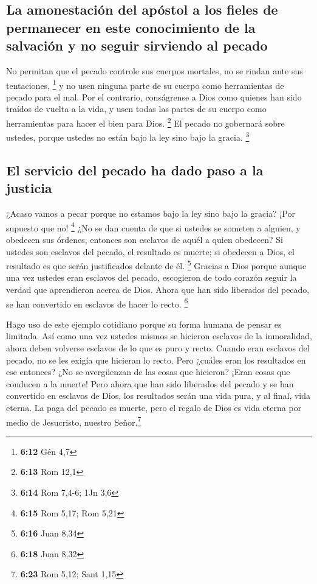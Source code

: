 \hypertarget{la-amonestaciuxf3n-del-apuxf3stol-a-los-fieles-de-permanecer-en-este-conocimiento-de-la-salvaciuxf3n-y-no-seguir-sirviendo-al-pecado}{%
\subsection{La amonestación del apóstol a los fieles de permanecer en
este conocimiento de la salvación y no seguir sirviendo al
pecado}\label{la-amonestaciuxf3n-del-apuxf3stol-a-los-fieles-de-permanecer-en-este-conocimiento-de-la-salvaciuxf3n-y-no-seguir-sirviendo-al-pecado}}

 No permitan que el pecado controle sus cuerpos mortales,
no se rindan ante sus tentaciones, \footnote{\textbf{6:12} Gén 4,7}
 y no usen ninguna parte de su cuerpo como herramientas
de pecado para el mal. Por el contrario, conságrense a Dios como quienes
han sido traídos de vuelta a la vida, y usen todas las partes de su
cuerpo como herramientas para hacer el bien para Dios. \footnote{\textbf{6:13}
  Rom 12,1}  El pecado no gobernará sobre ustedes, porque
ustedes no están bajo la ley sino bajo la gracia. \footnote{\textbf{6:14}
  Rom 7,4-6; 1Jn 3,6}

\hypertarget{el-servicio-del-pecado-ha-dado-paso-a-la-justicia}{%
\subsection{El servicio del pecado ha dado paso a la
justicia}\label{el-servicio-del-pecado-ha-dado-paso-a-la-justicia}}

 ¿Acaso vamos a pecar porque no estamos bajo la ley sino
bajo la gracia? ¡Por supuesto que no! \footnote{\textbf{6:15} Rom 5,17;
  Rom 5,21}  ¿No se dan cuenta de que si ustedes se
someten a alguien, y obedecen sus órdenes, entonces son esclavos de
aquél a quien obedecen? Si ustedes son esclavos del pecado, el resultado
es muerte; si obedecen a Dios, el resultado es que serán justificados
delante de él. \footnote{\textbf{6:16} Juan 8,34} 
Gracias a Dios porque aunque una vez ustedes eran esclavos del pecado,
escogieron de todo corazón seguir la verdad que aprendieron acerca de
Dios.  Ahora que han sido liberados del pecado, se han
convertido en esclavos de hacer lo recto. \footnote{\textbf{6:18} Juan
  8,32}

 Hago uso de este ejemplo cotidiano porque su forma
humana de pensar es limitada. Así como una vez ustedes mismos se
hicieron esclavos de la inmoralidad, ahora deben volverse esclavos de lo
que es puro y recto.  Cuando eran esclavos del pecado, no
se les exigía que hicieran lo recto.  Pero ¿cuáles eran
los resultados en ese entonces? ¿No se avergüenzan de las cosas que
hicieron? ¡Eran cosas que conducen a la muerte!  Pero
ahora que han sido liberados del pecado y se han convertido en esclavos
de Dios, los resultados serán una vida pura, y al final, vida eterna.
 La paga del pecado es muerte, pero el regalo de Dios es
vida eterna por medio de Jesucristo, nuestro Señor.\footnote{\textbf{6:23}
  Rom 5,12; Sant 1,15}

